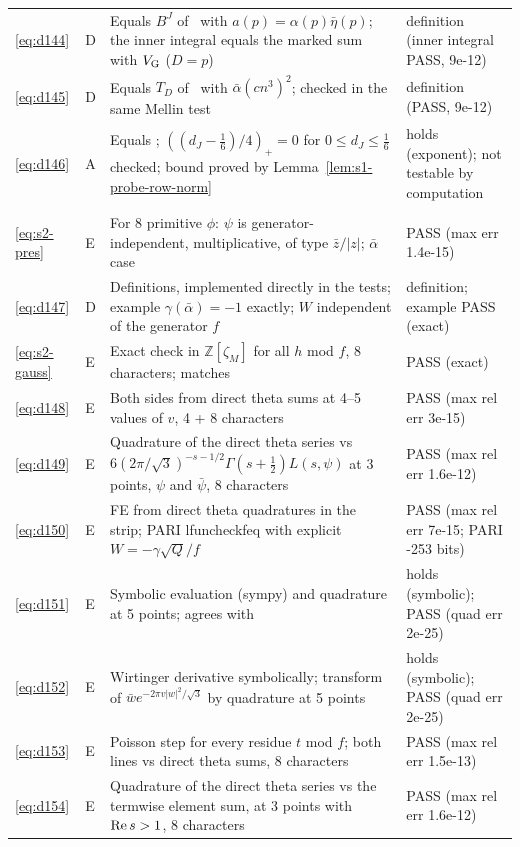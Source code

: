 \documentclass[11pt]{article}
\numberwithin{equation}{section}
\begin{document}
\begin{longtable}{@{}>{\raggedright\arraybackslash}p{1.2cm}>{\centering\arraybackslash}p{0.7cm}>{\raggedright\arraybackslash}p{9.05cm}>{\raggedright\arraybackslash}p{4.3cm}@{}}
\eqref{eq:d144} & D & Equals $B^J$ of~\cite{OAI78} with $a(p)=\alpha(p)\bar\eta(p)$; the inner integral equals the marked sum with $V_{\rm G}$ ($D=p$) & definition (inner integral PASS, 9e-12)\\
\eqref{eq:d145} & D & Equals $T_D$ of~\cite{OAI78} with $\bar\alpha(cn^3)^2$; checked in the same Mellin test & definition (PASS, 9e-12)\\
\eqref{eq:d146} & A & Equals \cite[eq.~(15.2)]{OAI78}; $((d_J-\frac16)/4)_+=0$ for $0\le d_J\le\frac16$ checked; bound proved by Lemma~\ref{lem:s1-probe-row-norm} & holds (exponent); not testable by computation\\
\multicolumn{4}{@{}l}{\emph{Appendix~C}}\\
\eqref{eq:s2-pres} & E & For 8 primitive $\phi$: $\psi$ is generator-independent, multiplicative, of type $\bar z/|z|$; $\bar\alpha$ case & PASS (max err 1.4e-15)\\
\eqref{eq:d147} & D & Definitions, implemented directly in the tests; example $\gamma(\bar\alpha)=-1$ exactly; $W$ independent of the generator $f$ & definition; example PASS (exact)\\
\eqref{eq:s2-gauss} & E & Exact check in $\mathbb Z[\zeta_M]$ for all $h$ mod $f$, 8 characters; matches \cite[Lemma~17]{QF} & PASS (exact)\\
\eqref{eq:d148} & E & Both sides from direct theta sums at 4--5 values of $v$, 4 + 8 characters & PASS (max rel err 3e-15)\\
\eqref{eq:d149} & E & Quadrature of the direct theta series vs $6(2\pi/\sqrt3)^{-s-1/2}\Gamma(s+\frac12)L(s,\psi)$ at 3 points, $\psi$ and $\bar\psi$, 8 characters & PASS (max rel err 1.6e-12)\\
\eqref{eq:d150} & E & FE from direct theta quadratures in the strip; PARI lfuncheckfeq with explicit $W=-\gamma\sqrt Q/f$ & PASS (max rel err 7e-15; PARI -253 bits)\\
\eqref{eq:d151} & E & Symbolic evaluation (sympy) and quadrature at 5 points; agrees with \cite[Example~20]{QF} & holds (symbolic); PASS (quad err 2e-25)\\
\eqref{eq:d152} & E & Wirtinger derivative symbolically; transform of $\bar w e^{-2\pi v|w|^2/\sqrt3}$ by quadrature at 5 points & holds (symbolic); PASS (quad err 2e-25)\\
\eqref{eq:d153} & E & Poisson step for every residue $t$ mod $f$; both lines vs direct theta sums, 8 characters & PASS (max rel err 1.5e-13)\\
\eqref{eq:d154} & E & Quadrature of the direct theta series vs the termwise element sum, at 3 points with ${\rm Re}\,s>1$, 8 characters & PASS (max rel err 1.6e-12)\\

\end{longtable}
\end{document}
